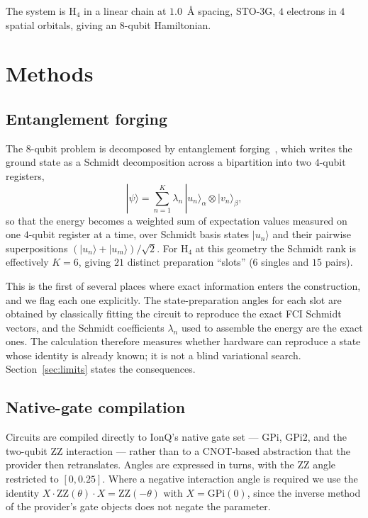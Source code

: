 \documentclass[aps,prx,twocolumn,superscriptaddress,nofootinbib,floatfix]{revtex4-2}
\begin{document}
The system is H$_4$ in a linear chain at $1.0$~\AA{} spacing, STO-3G,
$4$ electrons in $4$ spatial orbitals, giving an $8$-qubit Hamiltonian.

\section{Methods}

\subsection{Entanglement forging}

The $8$-qubit problem is decomposed by entanglement
forging~\cite{eddins2022}, which writes the ground state as a Schmidt
decomposition across a bipartition into two $4$-qubit registers,
\begin{equation}
|\psi\rangle = \sum_{n=1}^{K} \lambda_n\, |u_n\rangle_\alpha \otimes
|v_n\rangle_\beta ,
\end{equation}
so that the energy becomes a weighted sum of expectation values measured
on one $4$-qubit register at a time, over Schmidt basis states
$|u_n\rangle$ and their pairwise superpositions
$(|u_n\rangle+|u_m\rangle)/\sqrt2$. For H$_4$ at this geometry the Schmidt
rank is effectively $K=6$, giving $21$ distinct preparation ``slots''
($6$ singles and $15$ pairs).

This is the first of several places where exact information enters the
construction, and we flag each one explicitly. The state-preparation
angles for each slot are obtained by classically fitting the circuit to
reproduce the exact FCI Schmidt vectors, and the Schmidt coefficients
$\lambda_n$ used to assemble the energy are the exact ones. The
calculation therefore measures whether hardware can reproduce a state
whose identity is already known; it is not a blind variational search.
Section~\ref{sec:limits} states the consequences.

\subsection{Native-gate compilation}

Circuits are compiled directly to IonQ's native gate set --- $\mathrm{GPi}$,
$\mathrm{GPi2}$, and the two-qubit $\mathrm{ZZ}$ interaction --- rather than
to a CNOT-based abstraction that the provider then retranslates. Angles are
expressed in turns, with the $\mathrm{ZZ}$ angle restricted to
$[0,0.25]$. Where a negative interaction angle is required we use the
identity $X\!\cdot\!\mathrm{ZZ}(\theta)\!\cdot\!X = \mathrm{ZZ}(-\theta)$
with $X=\mathrm{GPi}(0)$, since the inverse method of the provider's gate
objects does not negate the parameter.
\end{document}
